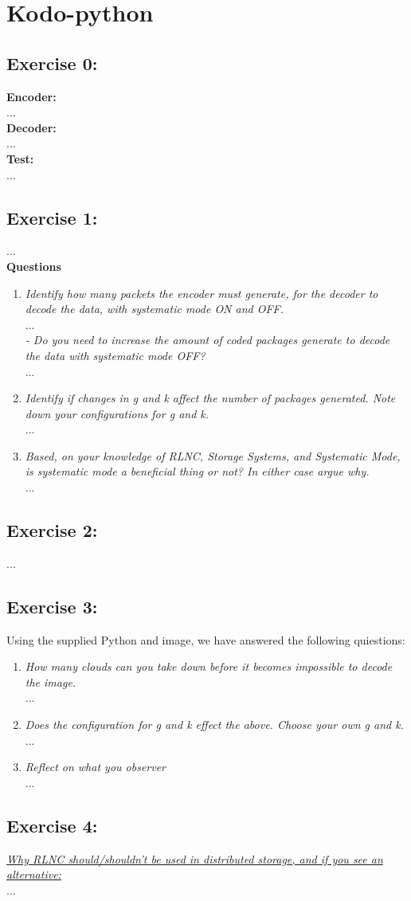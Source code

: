 \section{Kodo-python}

\subsection{Exercise 0:}
\textbf{Encoder:}\\
...\\
\textbf{Decoder:}\\
...\\
\textbf{Test:}\\
...

\subsection{Exercise 1:}
...\\
\textbf{Questions}
\begin{enumerate}
    \item \textit{Identify how many packets the encoder must generate, for the decoder to decode the data, with systematic mode ON and OFF.}\\ 
    ...\\
    \textit{ - Do you need to increase the amount of coded packages generate to decode the data with systematic mode OFF?}\\
    ...
    \item \textit{Identify if changes in g and k affect the number of packages generated. Note down your configurations for g and k.}\\
    ...
    \item \textit{Based, on your knowledge of RLNC, Storage Systems, and Systematic Mode, is systematic mode a beneficial thing or not? In either case argue why.}\\
    ...
\end{enumerate}

\subsection{Exercise 2:}
...

\subsection{Exercise 3:}
Using the supplied Python and image, we have answered the following quiestions:
\begin{enumerate}
    \item \textit{How many clouds can you take down before it becomes impossible to decode the image.}\\
    ...
    \item \textit{Does the configuration for g and k effect the above. Choose your own g and k.}\\
    ...
    \item \textit{Reflect on what you observer}\\
    ...
\end{enumerate}

\subsection{Exercise 4:}
\underline{\textit{Why RLNC should/shouldn't be used in distributed storage, and if you see an alternative:}}\\
...

\pagebreak
